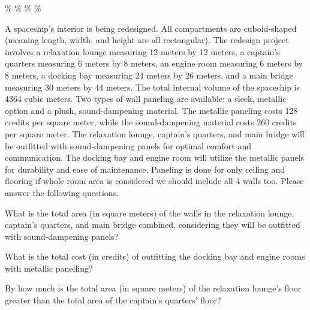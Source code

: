 \documentclass{exam}
\begin{document}
\begin{multicols}{2}
\begin{questions}
\begin{randomizechoices}
\% 
\%  
\% 
\% 
\end{randomizechoices}\begin{tcolorbox}[colback=yellow!15!white, colframe=brown!80!white, title=Data,arc=0pt]
A spaceship's interior is being redesigned. All compartments are cuboid-shaped (meaning length, width, and height are all rectangular). The redesign project involves a relaxation lounge measuring 12 meters by 12 meters, a captain's quarters measuring 6 meters by 8 meters, an engine room measuring 6 meters by 8 meters, a docking bay measuring 24 meters by 26 meters, and a main bridge measuring 30 meters by 44 meters. The total internal volume of the spaceship is 4364 cubic meters.  Two types of wall paneling are available: a sleek, metallic option and a plush, sound-dampening material. The metallic paneling costs 128 credits per square meter, while the sound-dampening material costs 260 credits per square meter.  The relaxation lounge, captain's quarters, and main bridge will be outfitted with sound-dampening panels for optimal comfort and communication. The docking bay and engine room will utilize the metallic panels for durability and ease of maintenance.  Paneling is done for only ceiling and flooring if whole room area is considered we should include all 4 walls too.
\tcblower
Please answer the following questions.
\end{tcolorbox}

\question  What is the total area (in square meters) of the walls in the relaxation lounge, captain's quarters, and main bridge combined, considering they will be outfitted with sound-dampening panels?

\begin{randomizechoices}
\end{randomizechoices}

\question    What is the total cost (in credits) of outfitting the docking bay and engine rooms with metallic panelling?

\begin{randomizechoices}
\end{randomizechoices}

\question   By how much is the total area (in square meters) of the relaxation lounge's floor greater than the total area of the captain's quarters' floor?


\end{questions}
\end{multicols}
\end{document}
